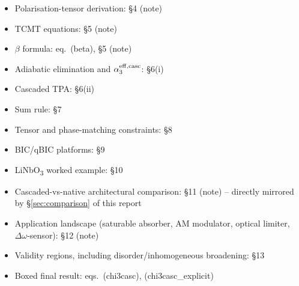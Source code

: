 \documentclass[11pt,a4paper]{article}
\newcommand{\Dom}{\Delta\omega}
\newcommand{\effc}{{\rm eff,casc}}
\begin{document}
\begin{itemize}[nosep]
\item Polarisation-tensor derivation: \S4 (note)
\item TCMT equations: \S5 (note)
\item $\beta$ formula: eq.~(beta), \S5 (note)
\item Adiabatic elimination and $\alpha_3^{\effc}$: \S6(i)
\item Cascaded TPA: \S6(ii)
\item Sum rule: \S7
\item Tensor and phase-matching constraints: \S8
\item BIC/qBIC platforms: \S9
\item LiNbO\textsubscript{3} worked example: \S10
\item Cascaded-vs-native architectural comparison: \S11 (note) --
      directly mirrored by \S\ref{sec:comparison} of this report
\item Application landscape (saturable absorber, AM modulator,
      optical limiter, $\Dom$-sensor): \S12 (note)
\item Validity regions, including disorder/inhomogeneous broadening: \S13
\item Boxed final result: eqs.~(chi3casc), (chi3casc\_explicit)
\end{itemize}
\end{document}

